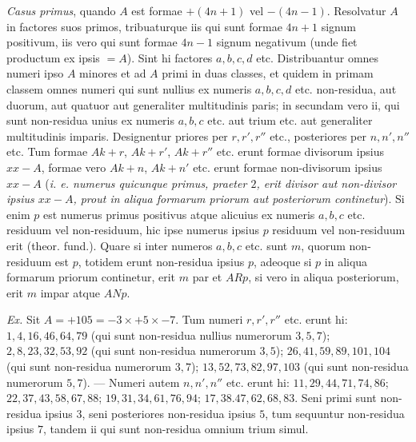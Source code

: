\textit{Casus primus}, quando $A$ est formae $+(4n+1)$ vel $-(4n-1)$. Resolvatur $A$ in factores suos primos, tribuaturque iis qui sunt formae $4n+1$ signum positivum, iis vero qui sunt formae $4n-1$ signum negativum (unde fiet productum ex ipsis $=A$). Sint hi factores $a,b,c,d$ etc. Distribuantur omnes numeri ipso $A$ minores et ad $A$ primi in duas classes, et quidem in primam classem omnes numeri qui sunt nullius ex numeris $a,b,c,d$ etc. non-residua, aut duorum, aut quatuor aut generaliter multitudinis paris; in secundam vero ii, qui sunt non-residua unius ex numeris $a,b,c$ etc. aut trium etc. aut generaliter multitudinis imparis. Designentur priores per $r,r',r''$ etc., posteriores per $n,n',n''$ etc. Tum formae $Ak+r$, $Ak+r'$, $Ak+r''$ etc. erunt formae divisorum ipsius $xx-A$, formae vero $Ak+n$, $Ak+n'$ etc. erunt formae non-divisorum ipsius $xx-A$ (\textit{i. e. numerus quicunque primus, praeter $2$, erit divisor aut non-divisor ipsius $xx-A$, prout in aliqua formarum priorum aut posteriorum continetur}). Si enim $p$ est numerus primus positivus atque alicuius ex numeris $a,b,c$ etc. residuum vel non-residuum, hic ipse numerus ipsius $p$ residuum vel non-residuum erit (theor. fund.). Quare si inter numeros $a,b,c$ etc. sunt $m$, quorum non-residuum est $p$, totidem erunt non-residua ipsius $p$, adeoque si $p$ in aliqua formarum priorum continetur, erit $m$ par et $ARp$, si vero in aliqua posteriorum, erit $m$ impar atque $ANp$.

\textit{Ex.} Sit $A=+105=-3\times+5\times-7$. Tum numeri $r,r',r''$ etc. erunt hi: $1,\allowbreak{}4,\allowbreak{}16,\allowbreak{}46,\allowbreak{}64,\allowbreak{}79$ (qui sunt non-residua nullius numerorum $3,\allowbreak{}5,\allowbreak{}7$); $2,\allowbreak{}8,\allowbreak{}23,\allowbreak{}32,\allowbreak{}53,\allowbreak{}92$ (qui sunt non-residua numerorum $3,\allowbreak{}5$); $26,\allowbreak{}41,\allowbreak{}59,\allowbreak{}89,\allowbreak{}101,\allowbreak{}104$ (qui sunt non-residua numerorum $3,\allowbreak{}7$); $13,\allowbreak{}52,\allowbreak{}73,\allowbreak{}82,\allowbreak{}97,\allowbreak{}103$ (qui sunt non-residua numerorum $5,\allowbreak{}7$). --- Numeri autem $n,n',n''$ etc. erunt hi: $11,\allowbreak{}29,\allowbreak{}44,\allowbreak{}71,\allowbreak{}74,\allowbreak{}86$; $22,\allowbreak{}37,\allowbreak{}43,\allowbreak{}58,\allowbreak{}67,\allowbreak{}88$; $19,\allowbreak{}31,\allowbreak{}34,\allowbreak{}61,\allowbreak{}76,\allowbreak{}94$; $17,\allowbreak{}38.47,\allowbreak{}62,\allowbreak{}68,\allowbreak{}83$. Seni primi sunt non-residua ipsius $3$, seni posteriores non-residua ipsius $5$, tum sequuntur non-residua ipsius $7$, tandem ii qui sunt non-residua omnium trium simul.

